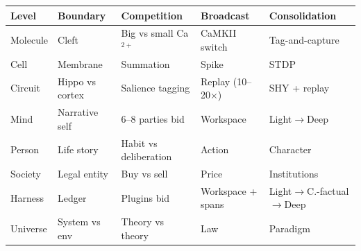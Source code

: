 \documentclass[11pt]{article}
\begin{document}
{\begin{center}
\small
\begin{tabular}{p{1.95cm}p{2.35cm}p{2.35cm}p{2.35cm}p{2.85cm}}
\toprule
Level & Boundary & Competition & Broadcast & Consolidation \\
\midrule
Molecule & Cleft & Big vs small Ca$^{2+}$ & CaMKII switch & Tag-and-capture \\
Cell & Membrane & Summation & Spike & STDP \\
Circuit & Hippo vs cortex & Salience tagging & Replay (10--20$\times$) & SHY + replay \\
Mind & Narrative self & 6--8 parties bid & Workspace & Light$\to$\allowbreak{}Deep \\
Person & Life story & Habit vs deliberation & Action & Character \\
Society & Legal entity & Buy vs sell & Price & Institutions \\
Harness & Ledger & Plugins bid & Workspace + spans & Light$\to$\allowbreak{}C.-factual$\to$\allowbreak{}Deep \\
Universe & System vs env & Theory vs theory & Law & Paradigm \\
\bottomrule
\end{tabular}
\end{center}

}
\end{document}
